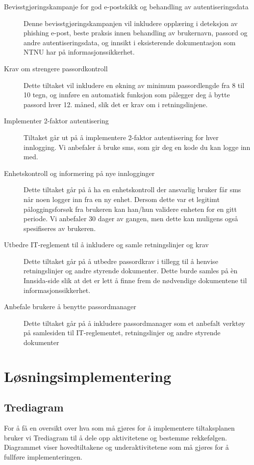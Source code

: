 \begin{description}
    \item[Bevisstgjøringskampanje for god e-postskikk og behandling av autentiseringsdata] Denne bevisstgjøringskampanjen vil inkludere opplæring i deteksjon av phishing e-post, beste praksis innen behandling av brukernavn, passord og andre autentiseringsdata, og innsikt i eksisterende dokumentasjon som NTNU har på informasjonssikkerhet. 
    \item[Krav om strengere passordkontroll] Dette tiltaket vil inkludere en økning av minimum passordlengde fra 8 til 10 tegn, og innføre en automatisk funksjon som pålegger deg å bytte passord hver 12. måned, slik det er krav om i retningslinjene. 
    \item[Implementer 2-faktor autentisering] Tiltaket går ut på å implementere 2-faktor autentisering for hver innlogging. Vi anbefaler å bruke sms, som gir deg en kode du kan logge inn med. 
    \item[Enhetskontroll og informering på nye innlogginger] Dette tiltaket går på å ha en enhetskontroll der ansvarlig bruker får sms når noen logger inn fra en ny enhet. Dersom dette var et legitimt påloggingsforsøk fra brukeren kan han/hun validere enheten for en gitt periode. Vi anbefaler 30 dager av gangen, men dette kan muligens også spesifiseres av brukeren. 
    \item[Utbedre IT-reglement til å inkludere og samle retningslinjer og krav] Dette tiltaket går på å utbedre passordkrav i tillegg til å henvise retningslinjer og andre styrende dokumenter. Dette burde samles på èn Innsida-side slik at det er lett å finne frem de nødvendige dokumentene til informasjonssikkerhet. 
    \item[Anbefale brukere å benytte passordmanager] Dette tiltaket går på å inkludere passordmanager som et anbefalt verktøy på samlesiden til IT-reglementet, retningslinjer og andre styrende dokumenter
\end{description}

\section{Løsningsimplementering}

\subsection{Trediagram}
For å få en oversikt over hva som må gjøres for å implementere tiltaksplanen bruker vi Trediagram til å dele opp aktivitetene og bestemme rekkefølgen. Diagrammet viser hovedtiltakene og underaktivitetene som må gjøres for å fullføre implementeringen. 

